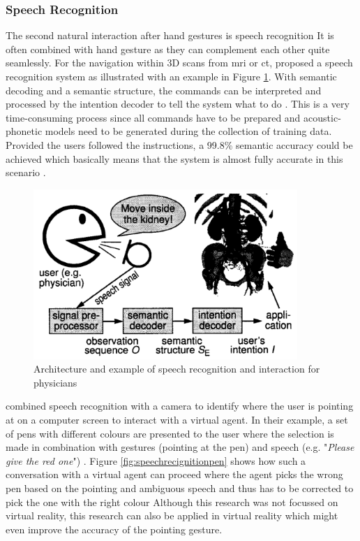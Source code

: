 \subsubsection{Speech Recognition}

\label{SubSubSectionSpeechRecognition}

The second natural interaction after hand gestures is speech recognition It is often combined with hand gesture as they can complement each other quite seamlessly. \newline
For the navigation within 3D scans from \gls{mri} or \gls{ct}, \cite{Muller1998} proposed a speech recognition system as illustrated with an example in Figure \ref{fig:speechrecognitionmedical}. With semantic decoding and a semantic structure, the commands can be interpreted and processed by the intention decoder to tell the system what to do \citep{Muller1998}. This is a very time-consuming process since all commands have to be prepared and acoustic-phonetic models need to be generated during the collection of training data. Provided the users followed the instructions, a 99.8\% semantic accuracy could be achieved which basically means that the system is almost fully accurate in this scenario \citep{Muller1998}.
\begin{figure}[h]
	\begin{center}
		\includegraphics[width=10cm]{03_Figures/05_LitReview/Muller1998_SpeechRecognition.png}
		\caption[Architecture and example of speech recognition and interaction for physicians]{Architecture and example of speech recognition and interaction for physicians \citep{Muller1998}}
		\label{fig:speechrecognitionmedical}
	\end{center}
\end{figure}
\newline
\cite{Uchino2008} combined speech recognition with a camera to identify where the user is pointing at on a computer screen to interact with a virtual agent. In their example, a set of pens with different colours are presented to the user where the selection is made in combination with gestures (pointing at the pen) and speech (e.g. "\textit{Please give the red one}") \citep{Uchino2008}. Figure \ref{fig:speechrecignitionpen} shows how such a conversation with a virtual agent can proceed where the agent picks the wrong pen based on the pointing and ambiguous speech and thus has to be corrected to pick the one with the right colour Although this research was not focussed on virtual reality, this research can also be applied in virtual reality which might even improve the accuracy of the pointing gesture.
